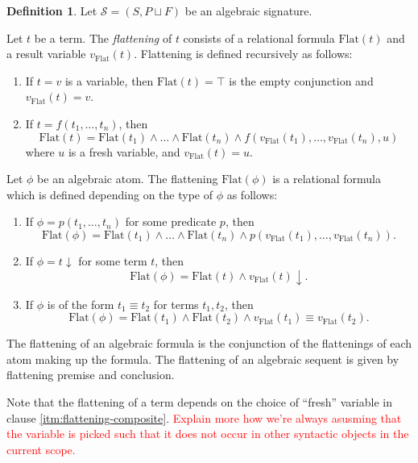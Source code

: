 \documentclass[a4paper]{article}
\newcommand{\todo}[1]{\textcolor{red}{#1}}
\theoremstyle{remark}
\theoremstyle{definition}
\newtheorem{definition}[theorem]{Definition}
\begin{document}
\begin{definition}
  Let $\mathcal{S} = (S, P \sqcup F)$ be an algebraic signature.

  Let $t$ be a term.
  The \emph{flattening} of $t$ consists of a relational formula $\mathrm{Flat}(t)$ and a result variable $v_\mathrm{Flat}(t)$.
  Flattening is defined recursively as follows:
  \begin{enumerate}
    \item
      If $t = v$ is a variable, then $\mathrm{Flat}(t) = \top$ is the empty conjunction and $v_\mathrm{Flat}(t) = v$.
    \item
      \label{itm:flattening-composite}
      If $t = f(t_1, \dots, t_n)$, then
      \begin{equation}
        \mathrm{Flat}(t) = \mathrm{Flat}(t_1) \land \dots \land \mathrm{Flat}(t_n) \land f(v_\mathrm{Flat}(t_1), \dots, v_\mathrm{Flat}(t_n), u)
      \end{equation}
      where $u$ is a fresh variable, and $v_\mathrm{Flat}(t) = u$.
  \end{enumerate}

  Let $\phi$ be an algebraic atom.
  The flattening $\mathrm{Flat}(\phi)$ is a relational formula which is defined depending on the type of $\phi$ as follows:
  \begin{enumerate}
    \item
      If $\phi = p(t_1, \dots, t_n)$ for some predicate $p$, then
      \begin{equation}
        \mathrm{Flat}(\phi) = \mathrm{Flat}(t_1) \land \dots \land \mathrm{Flat}(t_n) \land p(v_\mathrm{Flat}(t_1), \dots, v_\mathrm{Flat}(t_n)).
      \end{equation}
    \item
      If $\phi = t \downarrow$ for some term $t$, then
      \begin{equation}
        \mathrm{Flat}(\phi) = \mathrm{Flat}(t) \land v_\mathrm{Flat}(t) \downarrow.
      \end{equation}
    \item
      If $\phi$ is of the form $t_1 \equiv t_2$ for terms $t_1, t_2$, then
      \begin{equation}
        \mathrm{Flat}(\phi) = \mathrm{Flat}(t_1) \land \mathrm{Flat}(t_2) \land v_\mathrm{Flat}(t_1) \equiv v_\mathrm{Flat}(t_2).
      \end{equation}
  \end{enumerate}
  The flattening of an algebraic formula is the conjunction of the flattenings of each atom making up the formula.
  The flattening of an algebraic sequent is given by flattening premise and conclusion.
\end{definition}
Note that the flattening of a term depends on the choice of ``fresh'' variable in clause \ref{itm:flattening-composite}.
\todo{Explain more how we're always asusming that the variable is picked such that it does not occur in other syntactic objects in the current scope.}
\end{document}
